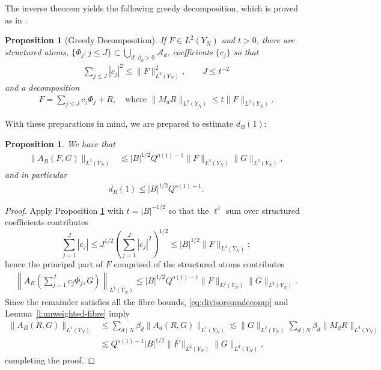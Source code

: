 \documentclass[12pt,leqno]{amsart}
\numberwithin{equation}{section}
\newtheorem{proposition}[equation]{Proposition}
\theoremstyle{definition}
\theoremstyle{plain}
\begin{document}
	
	
	
	The inverse theorem \cite[Lemma 5.5]{FKMS26} yields the following greedy decomposition, which is proved as in \cite[Proposition 5.7]{FKMS26}.
	
	\begin{proposition}[Greedy Decomposition]\label{p:greedy}
		If $F\in L^2(Y_N)$ and $t>0$, there are structured atoms, $\{ \Phi_j : j \leq J\}\subset\bigcup_{d:\,\beta_d>0}\mathcal A_d$, coefficients $\{ c_j \}$ so that
		\begin{align}
			\sum_{j \leq J} |c_j|^2 \leq \|F \|_{L^2(Y_N)}^2, \qquad J \leq t^{-2}
		\end{align}
		and a decomposition
		\begin{align}
			F = \sum_{j \leq J} c_j \Phi_j + R,\quad \text{where } \| M_d R \|_{L^2(Y_N)} \leq t \|F \|_{L^2(Y_N)}.
		\end{align}
		
	\end{proposition}
	With these preparations in mind, we are prepared to estimate $d_B(1)$:
	\begin{proposition} \label{l:d4}
		We have that 
		\begin{align}
			\| A_B(F,G) \|_{L^1(Y_N)} &\lesssim |B|^{1/2} Q^{o(1) - 1} \|F \|_{L^2(Y_N)} \| G \|_{L^2(Y_N)}, 
		\end{align}
		and in particular
		\begin{align}
			d_B(1) \leq |B|^{1/2} Q^{o(1) -1}.
		\end{align}
	\end{proposition}
	\begin{proof}
		Apply Proposition \ref{p:greedy} with $t = |B|^{-1/2}$ so that the $\ell^1$ sum over structured coefficients contributes 
		\[ \sum_{j=1}^J|c_j| \leq J^{1/2}(\sum_{j=1}^J|c_j|^2)^{1/2}\leq |B|^{1/2}\|F\|_{L^2(Y_N)};\]
		hence the principal part of $F$ comprised of the structured atoms contributes
		\begin{align}
			\left \| A_B\left (\sum_{j=1}^J c_j \Phi_j,G \right )  \right \|_{L^1(Y_N)} \leq   |B|^{1/2} Q^{o(1) -1 } \|F \|_{L^2(Y_N)} \|G \|_{L^2(Y_N)}.
		\end{align}
		Since the remainder satisfies all the fibre bounds, \eqref{eq:divisorsumdecomp} and Lemma~\ref{l:unweighted-fibre} imply
		\begin{align}
			\|A_B(R,G)\|_{L^1(Y_N)}
			&\leq\sum_{d\mid N}\beta_d\|A_d(R,G)\|_{L^1(Y_N)}\lesssim\|G\|_{L^2(Y_N)}
			\sum_{d\mid N}\beta_d\|M_dR\|_{L^2(Y_N)}\\
			&\lesssim Q^{o(1)-1}|B|^{1/2}
			\|F\|_{L^2(Y_N)}\|G\|_{L^2(Y_N)},
		\end{align}
		completing the proof.
	\end{proof}
	
\end{document}
